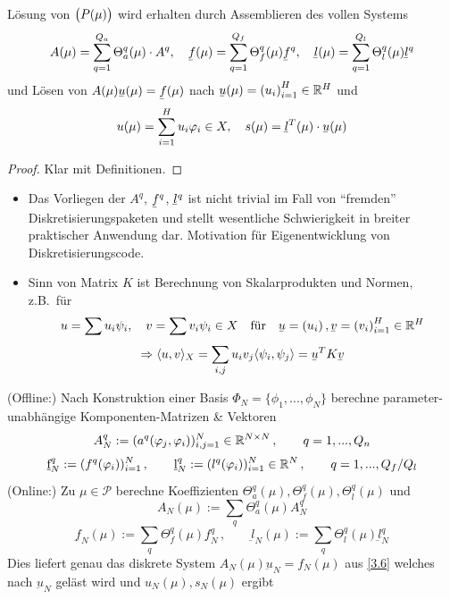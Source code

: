 \begin{kor}
\label{3.20}
	Lösung von $\big(P(\mu)\big)$ wird erhalten durch Assemblieren des vollen Systems
	\[
		A(\mu) = \sum_{q=1}^{Q_a} \Theta_a^q(\mu) \cdot A^q, \quad \ubar f(\mu) = \sum_{q=1}^{Q_f} \Theta_f^q(\mu) \ubar f^q, \quad \ubar l(\mu) = \sum_{q=1}^{Q_l} \Theta_l^q(\mu) \ubar l^q
	\]
	und Lösen von $A(\mu) \ubar u(\mu) = \ubar f(\mu)$ nach $\ubar u(\mu) = \seq{u_i}_{i=1}^H \in \R^H$ und
	\[
		u(\mu) = \sum_{i=1}^H u_i \phi_i \in X, \quad s(\mu) = \ubar l^T(\mu) \cdot \ubar u(\mu)
	\]

	\begin{proof}
		Klar mit Definitionen.
	\end{proof}
\end{kor}

\begin{bem} \beginwithlistbem
	\begin{itemize}
		\item Das Vorliegen der $A^q$, $\ubar f^q$, $\ubar l^q$ ist nicht trivial im Fall von ``fremden'' Diskretisierungspaketen und stellt wesentliche Schwierigkeit in breiter praktischer Anwendung dar.
			Motivation für Eigenentwicklung von Diskretisierungscode.
		\item Sinn von Matrix $K$ ist Berechnung von Skalarprodukten und Normen, z.B.\ für
			\[
				u = \sum u_i \psi_i, \quad v = \sum v_i \psi_i \in X \quad \text{für} \quad \ubar u = \seq{u_i}, \ubar v = \seq{v_i}_{i=1}^H \in \R^H
			\]
			\[
				\Rightarrow \dotp{u}{v}_X = \sum_{i,j} u_i v_j \dotp{\psi_i}{\psi_j} = \ubar u^T K \ubar v
			\]
	\end{itemize}
\end{bem}

\begin{kor}
\label{3.21}
(Offline:) Nach Konstruktion einer Basis $\Phi_N = \{\phi_1,...,\phi_N\}$ berechne parameter-unabhängige Komponenten-Matrizen \& Vektoren
\[
	A_N^q := (a^q(\varphi_j,\varphi_i))_{i,j = 1}^N \in \mathbb{R}^{N \times N} \, , \qquad q = 1,...,Q_n
\]
\[
	\underbar f_N^q := (f^q(\varphi_i))_{i=1}^N \, , \qquad 	\underbar l_N^q := (l^q(\varphi_i))_{i=1}^N \in \mathbb{R}^N \, , \qquad q = 1,...,Q_f/Q_l
\]
(Online:) Zu $\mu \in \mathcal{P}$ berechne Koeffizienten $\Theta_a^q(\mu), \Theta_f^q(\mu), \Theta_l^q(\mu)$ und 
\[
	A_N (\mu) := \sum_q  \Theta_a^q(\mu) A_N^q
\]
\[
	\underbar f_N (\mu) := \sum_q \Theta_f^q(\mu) \underbar f_N^q \, , \qquad \underbar l_N (\mu) := \sum_q \Theta_l^q(\mu) \underbar l_N^q
\]
Dies liefert genau das diskrete System $A_N(\mu) \underbar u_N = f_N(\mu)$ aus \ref{3.6} welches nach $\underbar u_N$ geläst wird und $u_N(\mu), s_N(\mu)$ ergibt
\end{kor}

